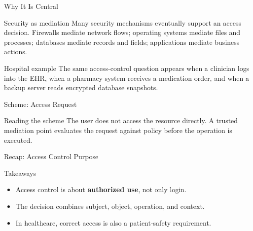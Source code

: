 \documentclass[presentation]{beamer}
\begin{document}
\begin{frame}[c]{Why It Is Central}
\begin{block}{Security as mediation}
Many security mechanisms eventually support an access decision. Firewalls mediate network flows;
operating systems mediate files and processes; databases mediate records and fields; applications
mediate business actions.
\end{block}

\begin{exampleblock}{Hospital example}
The same access-control question appears when a clinician logs into the EHR, when a pharmacy
system receives a medication order, and when a backup server reads encrypted database snapshots.
\end{exampleblock}
\end{frame}

\begin{frame}[c]{Scheme: Access Request}
\begin{center}
\end{center}

\begin{block}{Reading the scheme}
The user does not access the resource directly. A trusted mediation point evaluates the request
against policy before the operation is executed.
\end{block}
\end{frame}

\begin{frame}[c]{Recap: Access Control Purpose}
\begin{block}{Takeaways}
\begin{itemize}
    \item Access control is about \textbf{authorized use}, not only login.
    \item The decision combines subject, object, operation, and context.
    \item In healthcare, correct access is also a patient-safety requirement.
\end{itemize}
\end{block}
\end{frame}
\end{document}
